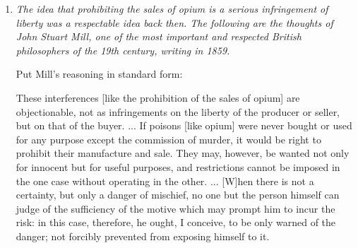 \begin{enumerate}


\item \emph{The idea that prohibiting the sales of opium is a serious 
 infringement of liberty was a respectable idea back then. The following are the 
thoughts of John Stuart Mill, one of the most important and respected British 
philosophers of the 19th century, writing in 1859.}

 Put Mill's reasoning in standard form:

 These interferences [like the prohibition of the sales of opium] are 
 objectionable, not as infringements on the liberty of the producer or seller, 
 but on that of the buyer. ...  If poisons [like opium]  were never bought or 
 used for any purpose except the commission of murder, it would be right to 
 prohibit their manufacture and sale.  They may, however, be wanted not only for 
 innocent but for useful purposes, and restrictions cannot be imposed in the one 
 case without operating in the other.  ...  [W]hen there is not a certainty, but 
 only a danger of mischief, no one but the person himself can judge of the 
 sufficiency of the motive which may prompt him to incur the risk: in this case, 
 therefore, he ought, I conceive, to be only warned of the danger; not forcibly 
 prevented from exposing himself to it.


\end{enumerate}
